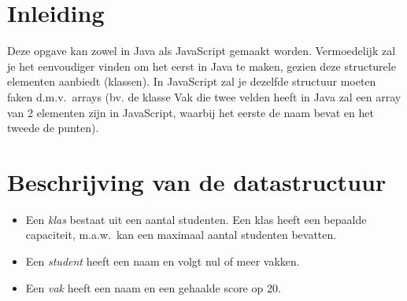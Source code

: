 \documentclass[a4paper]{article}
\begin{document}
\section{Inleiding}
Deze opgave kan zowel in Java als JavaScript gemaakt worden.
Vermoedelijk zal je het eenvoudiger vinden om het eerst in Java te maken,
gezien deze structurele elementen aanbiedt (klassen). In JavaScript
zal je dezelfde structuur moeten faken d.m.v.\ arrays (bv. de klasse Vak
die twee velden heeft in Java zal een array van 2 elementen zijn in JavaScript,
waarbij het eerste de naam bevat en het tweede de punten).

\section{Beschrijving van de datastructuur}
\begin{itemize}
  \item Een \emph{klas} bestaat uit een aantal studenten. Een klas heeft een bepaalde capaciteit, m.a.w.\ kan
        een maximaal aantal studenten bevatten.
  \item Een \emph{student} heeft een naam en volgt nul of meer vakken.
  \item Een \emph{vak} heeft een naam en een gehaalde score op 20.
\end{itemize}

\begin{center}
\end{center}
\end{document}
